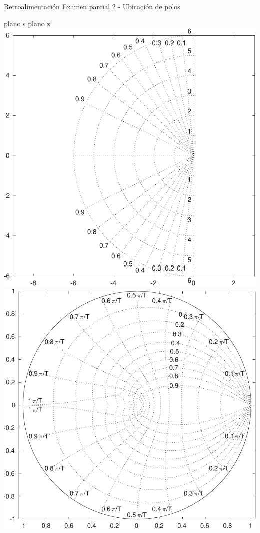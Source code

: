 \documentclass[presentation,aspectratio=169]{beamer}
\begin{document}
\begin{frame}[label={sec:orgb9b7e5c}]{Retroalimentación Examen parcial 2 - Ubicación de polos}
\begin{center}
\alert{plano s} \hspace*{0.4\linewidth} \alert{plano z}\\
\includegraphics[height=0.61\textheight]{../../figures/sgrid-crop} \hspace*{3mm}
\includegraphics[height=0.6\textheight]{../../figures/zgrid-crop}\\
\end{center}
\end{frame}
\end{document}
